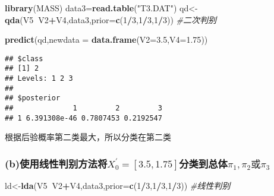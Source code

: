 \documentclass[
]{article}
\newenvironment{Shaded}{\begin{snugshade}}{\end{snugshade}}
\newcommand{\CommentTok}[1]{\textcolor[rgb]{0.56,0.35,0.01}{\textit{#1}}}
\newcommand{\DataTypeTok}[1]{\textcolor[rgb]{0.13,0.29,0.53}{#1}}
\newcommand{\DecValTok}[1]{\textcolor[rgb]{0.00,0.00,0.81}{#1}}
\newcommand{\FloatTok}[1]{\textcolor[rgb]{0.00,0.00,0.81}{#1}}
\newcommand{\KeywordTok}[1]{\textcolor[rgb]{0.13,0.29,0.53}{\textbf{#1}}}
\newcommand{\NormalTok}[1]{#1}
\newcommand{\OperatorTok}[1]{\textcolor[rgb]{0.81,0.36,0.00}{\textbf{#1}}}
\newcommand{\StringTok}[1]{\textcolor[rgb]{0.31,0.60,0.02}{#1}}
\begin{document}
\begin{Shaded}
\begin{Highlighting}[]
\KeywordTok{library}\NormalTok{(MASS)}
\NormalTok{data3=}\KeywordTok{read.table}\NormalTok{(}\StringTok{"T3.DAT"}\NormalTok{)}
\NormalTok{qd<-}\KeywordTok{qda}\NormalTok{(V5}\OperatorTok{~}\NormalTok{V2}\OperatorTok{+}\NormalTok{V4,data3,}\DataTypeTok{prior=}\KeywordTok{c}\NormalTok{(}\DecValTok{1}\OperatorTok{/}\DecValTok{3}\NormalTok{,}\DecValTok{1}\OperatorTok{/}\DecValTok{3}\NormalTok{,}\DecValTok{1}\OperatorTok{/}\DecValTok{3}\NormalTok{)) }\CommentTok{#二次判别}
\end{Highlighting}
\end{Shaded}

\begin{Shaded}
\begin{Highlighting}[]
\KeywordTok{predict}\NormalTok{(qd,}\DataTypeTok{newdata =} \KeywordTok{data.frame}\NormalTok{(}\DataTypeTok{V2=}\FloatTok{3.5}\NormalTok{,}\DataTypeTok{V4=}\FloatTok{1.75}\NormalTok{))}
\end{Highlighting}
\end{Shaded}

\begin{verbatim}
## $class
## [1] 2
## Levels: 1 2 3
## 
## $posterior
##              1         2         3
## 1 6.391308e-46 0.7807453 0.2192547
\end{verbatim}

根据后验概率第二类最大，所以分类在第二类

\hypertarget{bux4f7fux7528ux7ebfux6027ux5224ux522bux65b9ux6cd5ux5c06x_03.51.75ux5206ux7c7bux5230ux603bux4f53pi_1pi_2ux6216pi_3}{%
\subsubsection{\texorpdfstring{(b)使用线性判别方法将\(X_{0}^{'}=[3.5,1.75]\)分类到总体\(\pi_{1},\pi_{2}或\pi_{3}\)}{(b)使用线性判别方法将X\_\{0\}\^{}\{'\}={[}3.5,1.75{]}分类到总体\textbackslash pi\_\{1\},\textbackslash pi\_\{2\}或\textbackslash pi\_\{3\}}}\label{bux4f7fux7528ux7ebfux6027ux5224ux522bux65b9ux6cd5ux5c06x_03.51.75ux5206ux7c7bux5230ux603bux4f53pi_1pi_2ux6216pi_3}}

\begin{Shaded}
\begin{Highlighting}[]
\NormalTok{ld<-}\KeywordTok{lda}\NormalTok{(V5}\OperatorTok{~}\NormalTok{V2}\OperatorTok{+}\NormalTok{V4,data3,}\DataTypeTok{prior=}\KeywordTok{c}\NormalTok{(}\DecValTok{1}\OperatorTok{/}\DecValTok{3}\NormalTok{,}\DecValTok{1}\OperatorTok{/}\DecValTok{3}\NormalTok{,}\DecValTok{1}\OperatorTok{/}\DecValTok{3}\NormalTok{)) }\CommentTok{#线性判别}
\end{Highlighting}
\end{Shaded}
\end{document}
